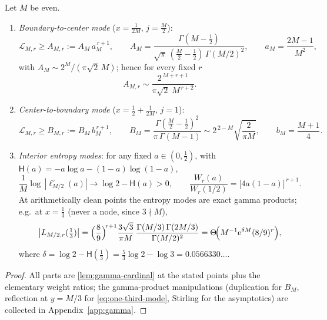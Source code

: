 \documentclass[11pt,oneside]{article}
\numberwithin{equation}{section}
\theoremstyle{definition}
\theoremstyle{remark}
\newcommand{\e}{\mathrm e}
\newcommand{\abs}[1]{\left\lvert #1\right\rvert}
\newcommand{\Leb}{\mathscr L}
\newcommand{\Hyp}{\mathsf H}
\begin{document}
\begin{proposition}
\label{prop:modes}
Let $M$ be even.
\begin{enumerate}
\item\emph{Boundary-to-center mode} ($x=\tfrac1{2M}$, $j=\tfrac M2$):
\begin{equation}
 \Leb_{M,r}\ge A_{M,r}:=A_M\,a_M^{\,r+1},
 \qquad
 A_M=\frac{\Gamma(M-\tfrac12)}
 {\sqrt\pi\,(\tfrac M2-\tfrac12)\,\Gamma(M/2)^{2}},
 \qquad
 a_M=\frac{2M-1}{M^{2}},
 \label{eq:A-mode}
\end{equation}
with $A_M\sim2^{M}/(\pi\sqrt2\,M)$; hence for every fixed $r$
\begin{equation}
 A_{M,r}\sim\frac{2^{\,M+r+1}}{\pi\sqrt2\;M^{\,r+2}}.
 \label{eq:A-asymptotic}
\end{equation}
\item\emph{Center-to-boundary mode} ($x=\tfrac12+\tfrac1{2M}$,
$j=1$):
\begin{equation}
 \Leb_{M,r}\ge B_{M,r}:=B_M\,b_M^{\,r+1},
 \qquad
 B_M=\frac{\Gamma(\tfrac M2-\tfrac12)^{2}}{\pi\,\Gamma(M-1)}
 \sim2^{\,2-M}\sqrt{\frac{2}{\pi M}},
 \qquad
 b_M=\frac{M+1}{4}.
 \label{eq:B-mode}
\end{equation}
\item\emph{Interior entropy modes}: for any fixed $a\in(0,\tfrac12)$,
with $\Hyp(a)=-a\log a-(1-a)\log(1-a)$,
\begin{equation}
 \frac1M\log\,\abs{\ell^{\circ}_{M/2}(a)}
 \longrightarrow\log2-\Hyp(a)>0,
 \qquad
 \frac{W_r(a)}{W_r(1/2)}=\bigl[4a(1-a)\bigr]^{\,r+1}.
 \label{eq:entropy-mode}
\end{equation}
At arithmetically clean points the entropy modes are exact gamma
products; e.g.\ at $x=\tfrac13$ (never a node, since $3\nmid M$),
\begin{equation}
 \abs{L_{M/2,r}(\tfrac13)}
 =\Bigl(\frac89\Bigr)^{\!r+1}
 \frac{3\sqrt3}{\pi M}\,
 \frac{\Gamma(M/3)\,\Gamma(2M/3)}{\Gamma(M/2)^{2}}
 =\Theta\!\Bigl(M^{-1}\e^{\delta M}(8/9)^{r}\Bigr),
 \label{eq:one-third-mode}
\end{equation}
where $\delta=\log2-\Hyp(\tfrac13)=\tfrac53\log2-\log3
=0.0566330\ldots$.
\end{enumerate}
\end{proposition}

\begin{proof}
All parts are \cref{lem:gamma-cardinal} at the stated points plus the
elementary weight ratios; the gamma-product manipulations
(duplication for $B_M$, reflection at $y=M/3$ for
\eqref{eq:one-third-mode}, Stirling for the asymptotics) are collected
in Appendix~\ref{app:gamma}.
\end{proof}
\end{document}
